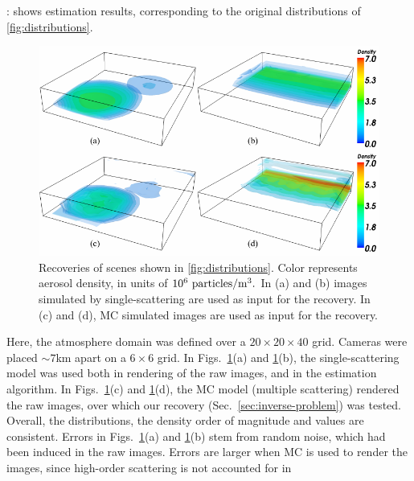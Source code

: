 \documentclass[10pt,letterpaper]{article}
\newcommand{\yoavcomment}[1]{}
\renewcommand{\yoavcomment}[1]{#1} %
\begin{document}
:
 shows estimation results, corresponding to the
original distributions of \cref{fig:distributions}.
\begin{figure}[t]
  \centering
  \yoavcomment{\includegraphics{images/results}}
  \caption{\small Recoveries of scenes shown in
    \cref{fig:distributions}. Color represents aerosol density, in
    units of $10^{6}~{\rm particles}/{\rm m}^3.$ In (a) and (b)
    images simulated by single-scattering are used as input for the
    recovery.  In (c) and (d), MC simulated images are used as input for the
    recovery.  }
  \label{fig:results}
\end{figure}
Here, the atmosphere domain was defined over a
$20\times20 \times 40$ grid. Cameras were placed
$\sim 7$km apart on a $6\times6$ grid.
In Figs.~\ref{fig:results}(a) and \ref{fig:results}(b), the single-scattering model was
used both in rendering of the raw images, and in the estimation algorithm. In
Figs.~\ref{fig:results}(c) and \ref{fig:results}(d), the MC model (multiple scattering)
rendered the raw images, over which our recovery (Sec.~\ref{sec:inverse-problem}) was tested.
Overall, the distributions, the density order of magnitude and values are consistent.
Errors in Figs.~\ref{fig:results}(a) and \ref{fig:results}(b) stem from random noise, which had
been induced in the raw images. Errors are larger when MC is used to
render the images, since high-order scattering is not accounted for in
\end{document}
